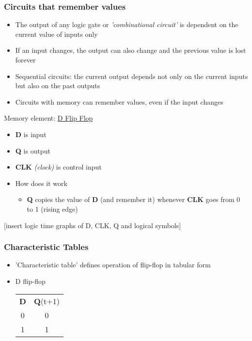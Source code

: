 \documentclass{article}
\begin{document}
\subsubsection{Circuits that remember values}
\begin{itemize}
\item The output of any logic gate or \textit{'combinational circuit'} is dependent on the current value of inputs only
\item If an input changes, the output can also change and the previous value is lost forever
\item Sequential circuits: the current output depends not only on the current inputs but also on the past outputs
\item Circuits with memory can remember values, even if the input changes
\end{itemize}

Memory element: \underline{D Flip Flop}
\begin{itemize}
\item \textbf{D} is input
\item \textbf{Q} is output
\item \textbf{CLK} \textit{(clock)} is control input
\item How does it work
\begin{itemize}
\item \textbf{Q} copies the value of \textbf{D} (and remember it) whenever \textbf{CLK} goes from 0 to 1 (rising edge)
\end{itemize}
\end{itemize}

[insert logic time graphs of D, CLK, Q and logical symbols]

\subsubsection{Characteristic Tables}
\begin{itemize}
\item 'Characteristic table' defines operation of flip-flop in tabular form
\item D flip-flop
\begin{tabular}{ c | c }
\textbf{D} & \textbf{Q}(t+1) \\
0 & 0 \\
1 & 1 \\
\end{tabular}
\end{itemize}
\end{document}
